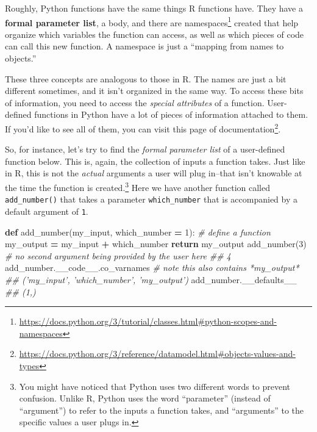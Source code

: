 \documentclass[12pt,krantz2]{krantz}
\makeatletter
\newenvironment{Shaded}{\begin{snugshade}}{\end{snugshade}}
\newcommand{\CommentTok}[1]{\textcolor[rgb]{0.37,0.37,0.37}{\textit{#1}}}
\newcommand{\ControlFlowTok}[1]{\textcolor[rgb]{0.27,0.27,0.27}{\textbf{#1}}}
\newcommand{\DecValTok}[1]{\textcolor[rgb]{0.06,0.06,0.06}{#1}}
\newcommand{\KeywordTok}[1]{\textcolor[rgb]{0.27,0.27,0.27}{\textbf{#1}}}
\newcommand{\NormalTok}[1]{#1}
\newcommand{\OperatorTok}[1]{\textcolor[rgb]{0.43,0.43,0.43}{\textbf{#1}}}
\renewcommand{\href}[2]{#2\footnote{\url{#1}}}
\newenvironment{kframe}{%
\medskip{}
\setlength{\fboxsep}{.8em}
 \def\at@end@of@kframe{}%
 \ifinner\ifhmode%
  \def\at@end@of@kframe{\end{minipage}}%
  \begin{minipage}{\columnwidth}%
 \fi\fi%
 \def\FrameCommand##1{\hskip\@totalleftmargin \hskip-\fboxsep
 \colorbox{shadecolor}{##1}\hskip-\fboxsep
     \hskip-\linewidth \hskip-\@totalleftmargin \hskip\columnwidth}%
 \MakeFramed {\advance\hsize-\width
   \@totalleftmargin\z@ \linewidth\hsize
   \@setminipage}}%
 {\par\unskip\endMakeFramed%
 \at@end@of@kframe}
\renewenvironment{Shaded}{\begin{kframe}}{\end{kframe}}
\makeatother
\begin{document}
Roughly, Python functions have the same things R functions have. They have a \textbf{formal parameter list}, a body, and there are \href{https://docs.python.org/3/tutorial/classes.html\#python-scopes-and-namespaces}{namespaces} created that help organize which variables the function can access, as well as which pieces of code can call this new function. A namespace is just a ``mapping from names to objects.''

These three concepts are analogous to those in R. The names are just a bit different sometimes, and it isn't organized in the same way. To access these bits of information, you need to access the \emph{special attributes} of a function. User-defined functions in Python have a lot of pieces of information attached to them. If you'd like to see all of them, you can visit \href{https://docs.python.org/3/reference/datamodel.html\#objects-values-and-types}{this page of documentation}.

So, for instance, let's try to find the \emph{formal parameter list} of a user-defined function below. This is, again, the collection of inputs a function takes. Just like in R, this is not the \emph{actual} arguments a user will plug in--that isn't knowable at the time the function is created.\footnote{You might have noticed that Python uses two different words to prevent confusion. Unlike R, Python uses the word ``parameter'' (instead of ``argument'') to refer to the inputs a function takes, and ``arguments'' to the specific values a user plugs in.} Here we have another function called \texttt{add\_number()} that takes a parameter \texttt{which\_number} that is accompanied by a default argument of \texttt{1}.

\begin{Shaded}
\begin{Highlighting}[]
\KeywordTok{def}\NormalTok{ add_number(my_input, which_number }\OperatorTok{=} \DecValTok{1}\NormalTok{): }\CommentTok{# define a function}
\NormalTok{    my_output }\OperatorTok{=}\NormalTok{ my_input }\OperatorTok{+}\NormalTok{ which_number}
    \ControlFlowTok{return}\NormalTok{ my_output}
\NormalTok{add_number(}\DecValTok{3}\NormalTok{) }\CommentTok{# no second argument being provided by the user here}
\CommentTok{## 4}
\NormalTok{add_number.__code__.co_varnames }\CommentTok{# note this also contains *my_output*}
\CommentTok{## ('my_input', 'which_number', 'my_output')}
\NormalTok{add_number.__defaults__}
\CommentTok{## (1,)}
\end{Highlighting}
\end{Shaded}
\end{document}
